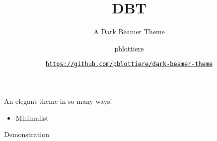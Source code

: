 \documentclass[12pt,t]{beamer}
\title{DBT}
\subtitle{A Dark Beamer Theme}
\author{\href{}{pblottiere}}
\institute {
    \href{}{LaTex} \\[2pt]
    \href{}{\tt \scriptsize 28/10/2015}
}
\date {
    \href{https://github.com/pblottiere/dark-beamer-theme}
         {\tt \scriptsize https://github.com/pblottiere/dark-beamer-theme}
}
\begin{document}
 {
    \frame {
        \titlepage
    }
}

\begin{frame}{An elegant theme in so many ways!}
    \vspace{40pt}
    \begin{itemize}
        \itemsep20pt
        \item Minimalist

    \end{itemize}
\end{frame}

\begin{frame}[fragile]{Demonstration}
    \vspace{50pt}
    
\end{frame}
\end{document}
